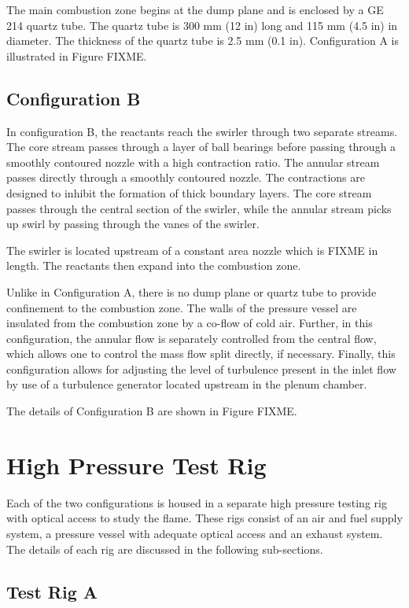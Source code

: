 The main combustion zone begins at the dump plane and is enclosed by a GE 214 quartz tube.
The quartz tube is 300 mm (12 in) long and 115 mm (4.5 in) in diameter.
The thickness of the quartz tube is 2.5 mm (0.1 in).
Configuration A is illustrated in Figure FIXME.

\subsection{Configuration B}

In configuration B, the reactants reach the swirler through two separate streams.
The core stream passes through a layer of ball bearings before passing through a smoothly contoured nozzle with a high contraction ratio.
The annular stream passes directly through a smoothly contoured nozzle.
The contractions are designed to inhibit the formation of thick boundary layers.
The core stream passes through the central section of the swirler, while the annular stream picks up swirl by passing through the vanes of the swirler.

The swirler is located upstream of a constant area nozzle which is FIXME in length.
The reactants then expand into the combustion zone.

Unlike in Configuration A, there is no dump plane or quartz tube to provide confinement to the combustion zone.
The walls of the pressure vessel are insulated from the combustion zone by a co-flow of cold air.
Further, in this configuration, the annular flow is separately controlled from the central flow, which allows one to control the mass flow split directly, if necessary.
Finally, this configuration allows for adjusting the level of turbulence present in the inlet flow by use of a turbulence generator located upstream in the plenum chamber.

The details of Configuration B are shown in Figure FIXME.

\section{High Pressure Test Rig}

Each of the two configurations is housed in a separate high pressure testing rig with optical access to study the flame.
These rigs consist of an air and fuel supply system, a pressure vessel with adequate optical access and an exhaust system.
The details of each rig are discussed in the following sub-sections.

\subsection{Test Rig A}


